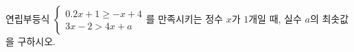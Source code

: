 연립부등식 $\begin{cases} 0.2x+1\ge -x+4 \\ 3x-2>4x+a \end{cases}$를 만족시키는 정수 $x$가 $1$개일 때, 실수 $a$의 최솟값을 구하시오.
